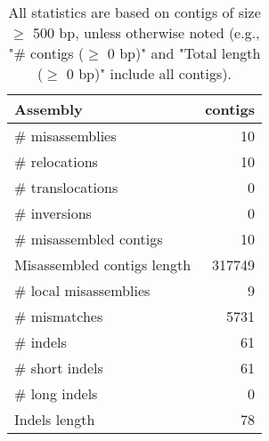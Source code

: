 \documentclass[12pt,a4paper]{article}
\begin{document}
\begin{table}[ht]
\begin{center}
\caption{All statistics are based on contigs of size $\geq$ 500 bp, unless otherwise noted (e.g., "\# contigs ($\geq$ 0 bp)" and "Total length ($\geq$ 0 bp)" include all contigs).}
\begin{tabular}{|l*{1}{|r}|}
\hline
Assembly & contigs \\ \hline
\# misassemblies & 10 \\ \hline
\hspace{5mm}\# relocations & 10 \\ \hline
\hspace{5mm}\# translocations & 0 \\ \hline
\hspace{5mm}\# inversions & 0 \\ \hline
\# misassembled contigs & 10 \\ \hline
Misassembled contigs length & 317749 \\ \hline
\# local misassemblies & 9 \\ \hline
\# mismatches & 5731 \\ \hline
\# indels & 61 \\ \hline
\hspace{5mm}\# short indels & 61 \\ \hline
\hspace{5mm}\# long indels & 0 \\ \hline
Indels length & 78 \\ \hline
\end{tabular}
\end{center}
\end{table}
\end{document}
